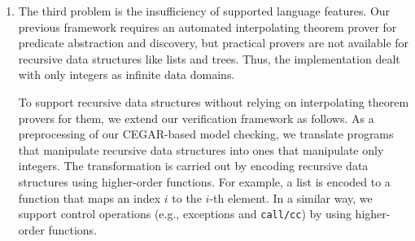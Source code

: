 \begin{enumerate}
%


%
%

\item The third problem is the insufficiency of supported language
      features.  Our previous framework requires an
      automated interpolating theorem prover for predicate abstraction and
      discovery, but practical provers are not available for recursive data
      structures like lists and trees. Thus, the implementation dealt with
      only integers as infinite data domains.

      To support recursive data structures without relying on interpolating
      theorem provers for them, we extend our verification framework as follows.
      As a preprocessing of our CEGAR-based model checking,
      we translate programs that manipulate recursive data structures into ones that manipulate only integers.
      The transformation is carried out by encoding recursive data structures using higher-order functions.  For example, a list is
      encoded to a function that maps an index $i$ to the $i$-th element.
      In a similar way, we support control operations (e.g., exceptions and \texttt{call/cc}) by using higher-order functions.
\end{enumerate}

